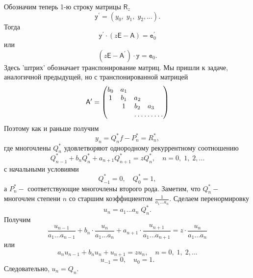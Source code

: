 \documentclass[12pt,a4paper]{article}
\theoremstyle{plain}   \newtheorem{Pro}{Задача}
\begin{document}
Обозначим теперь 1-ю строку матрицы
$ \mathsf{R}_z $
$$
  \mathtt{y}^{\prime}=(y_0 , \; y_1 , \; y_2 ,...).
$$
Тогда
$$
  \mathtt{y}^{\prime} \cdot
  (z \mathsf{E}-\mathsf{A})= \mathtt{e}_0 ^{\prime}
$$
или
$$
  (z\mathsf{E}-\mathsf{A}^{\prime})\cdot \mathtt{y} =\mathtt{e}_0 .
$$
Здесь 'штрих' обозначает транспонирование матриц.
Мы пришли к задаче, аналогичной предыдущей, но с транспонированной
матрицей
\begin{equation*}
  \mathsf{A}^{\prime}=
    \begin{pmatrix}
	  b_0 & a_1 & \; & \; & \; \\
	  1 & b_1 & a_2 & \; & \; \\
	  \; & 1 & b_2 & a_3 & \; \\
	  \; & \; & \hdotsfor{3}
	\end{pmatrix}
\end{equation*}
Поэтому как и раньше получим
$$
  y_n = Q_n ^{\ast} f -P_n ^{\ast} =R_n ^{\ast},
$$
где многочлены
$ Q_n ^{\ast} $
удовлетворяют однородному рекуррентному соотношению
$$
  Q_{n-1}^{\ast} +b_n Q_n ^{\ast} + a_{n+1} Q_{n+1}^{\ast}=
  zQ_n ^{\ast} , \quad n=0, \; 1, \; 2,...
$$
с начальными условиями
$$
  Q_{-1}^{\ast}=0, \quad
  Q_0 ^{\ast}=1,
$$
а
$ P_n ^{\ast} - $
соответствующие многочлены второго рода. Заметим, что
$ Q_n ^{\ast} - $
многочлен степени
$ n $
со старшим коэффициентом
$ \frac{1}{a_1 ...a_n } . $
Сделаем перенормировку
$$
  u_n =a_1 ... a_n \; Q_n ^{\ast} .
$$
Получим
$$
  \frac{u_{n-1}}{a_1 ...a_{n-1}}+
  b_n \cdot \frac{u_n}{a_1 ...a_n }+
  a_{n+1} \cdot \frac{u_{n+1}}{a_1 ...a_{n+1}}=
  z \cdot \frac{u_n}{a_1 ...a_n }
$$
или
$$
  a_n u_{n-1}+b_n u_n + u_{n+1} =z u_n ,
  \quad n=0, \; 1, \; 2,...
$$
$$
  u_{-1}=0, \quad u_0 =1.
$$
Следовательно,
$ u_n =Q_n . $
\\
\end{document}

